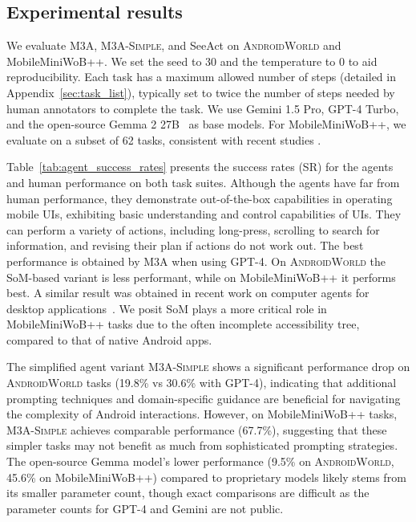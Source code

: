 \documentclass{article}
\newcommand{\system}{\textsc{AndroidWorld}\xspace}
\newcommand{\agent}{\textsc{M3A}\xspace}
\newcommand{\agentsimple}{\textsc{M3A-Simple}\xspace}
\newcommand{\mobileminiwob}{MobileMiniWoB++\xspace}
\begin{document}
\subsection{Experimental results}
\label{sec:experiment_results}

We evaluate \agent, \agentsimple, and SeeAct on \system and \mobileminiwob. We set the seed to 30 and the temperature to 0 to aid reproducibility. Each task has a maximum allowed number of steps (detailed in Appendix~\ref{sec:task_list}), typically set to twice the number of steps needed by human annotators to complete the task. We use Gemini 1.5 Pro, GPT-4 Turbo, and the open-source Gemma 2 27B~\citep{gemmateam2024gemma2improvingopen} as base models. For \mobileminiwob, we evaluate on a subset of 62 tasks, consistent with recent studies \citep{zheng2024synapse, kim2024language, gur2022understanding}.

Table~\ref{tab:agent_success_rates} presents the success rates (SR) for the agents and human performance on both task suites. Although the agents have far from human performance, they demonstrate out-of-the-box capabilities in operating mobile UIs, exhibiting basic understanding and control capabilities of UIs. They can perform a variety of actions, including long-press, scrolling to search for information, and revising their plan if actions do not work out. The best performance is obtained by M3A when using GPT-4. On \system the SoM-based variant is less performant, while on \mobileminiwob it performs best. A similar result was obtained in recent work on computer agents for desktop applications~\citep{xie2024osworld}. We posit SoM plays a more critical role in \mobileminiwob tasks due to the often incomplete accessibility tree, compared to that of native Android apps.

The simplified agent variant \agentsimple shows a significant performance drop on \system tasks (19.8\% vs 30.6\% with GPT-4), indicating that additional prompting techniques and domain-specific guidance are beneficial for navigating the complexity of Android interactions. However, on \mobileminiwob tasks, \agentsimple achieves comparable performance (67.7\%), suggesting that these simpler tasks may not benefit as much from sophisticated prompting strategies. The open-source Gemma model's lower performance (9.5\% on \system, 45.6\% on \mobileminiwob) compared to proprietary models likely stems from its smaller parameter count, though exact comparisons are difficult as the parameter counts for GPT-4 and Gemini are not public.
\end{document}
